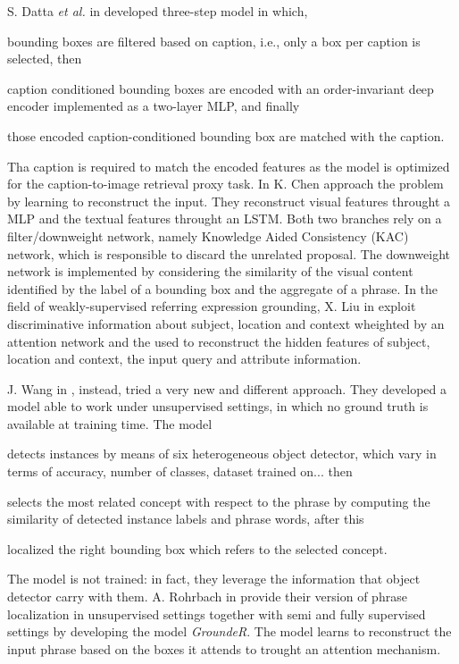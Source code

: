 
S. Datta \textit{et al.} in  developed three-step
model in which, 
\begin{enumerate*}[label=(\roman*)] 
    \item bounding boxes are filtered based on caption, i.e., only a
    box per caption is selected, then
    \item caption conditioned bounding boxes are encoded with an
    order-invariant deep encoder implemented as a two-layer MLP, and
    finally
    \item those encoded caption-conditioned bounding box are matched
with the caption.
\end{enumerate*}
Tha caption is required to match the encoded features as the model is
optimized for the caption-to-image retrieval proxy task. In  K.
Chen \etal{} approach the problem by learning to reconstruct the
input. They reconstruct visual features throught a MLP and the textual
features throught an LSTM. Both two branches rely on a
filter/downweight network, namely Knowledge Aided Consistency (KAC)
network, which is responsible to discard the unrelated proposal. The
downweight network is implemented by considering the similarity of the
visual content identified by the label of a bounding box and the
aggregate of a phrase. In the field of weakly-supervised referring
expression grounding, X. Liu \etal{} in 
exploit discriminative information about subject, location and context
wheighted by an attention network and the used to reconstruct the
hidden features of subject, location and context, the input query and
attribute information.

J. Wang in \etal{} , instead, tried a very new
and different approach. They developed a model able to work under
unsupervised settings, in which no ground truth is available at
training time. The model 
\begin{enumerate*}[label=(\roman*)] 
    \item detects instances by means of six heterogeneous object
    detector, which vary in terms of accuracy, number of classes,
    dataset trained on... then
    \item selects the most related concept with respect to the phrase
    by computing the similarity of detected instance labels and phrase
    words, after this
    \item localized the right bounding box which refers to the
    selected concept.
\end{enumerate*}
The model is not trained: in fact, they leverage the information that
object detector carry with them. A. Rohrbach \etal{} in  provide their version of phrase localization in
unsupervised settings together with semi and fully supervised settings
by developing the model \textit{GroundeR}. The model learns to
reconstruct the input phrase based on the boxes it attends to trought
an attention mechanism. 

